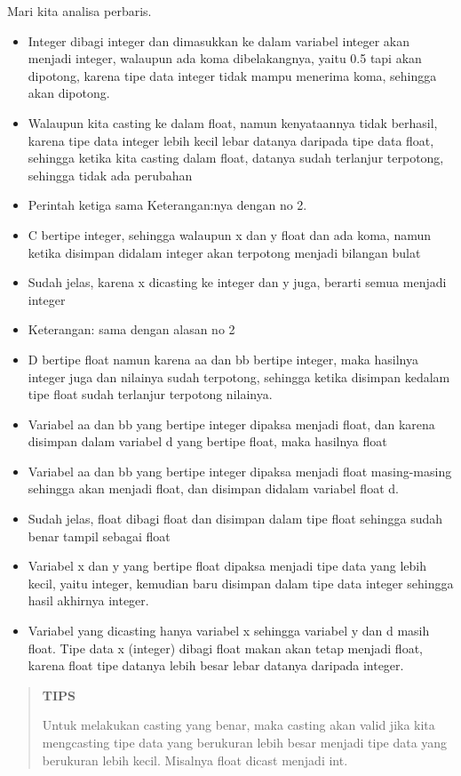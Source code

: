 Mari kita analisa perbaris.

\begin{itemize}

\item
Integer dibagi integer dan dimasukkan ke dalam variabel integer akan
menjadi integer, walaupun ada koma dibelakangnya, yaitu 0.5 tapi akan
dipotong, karena tipe data integer tidak mampu menerima koma, sehingga
akan dipotong.
\item
Walaupun kita casting ke dalam float, namun kenyataannya tidak
berhasil, karena tipe data integer lebih kecil lebar datanya daripada
tipe data float, sehingga ketika kita casting dalam float, datanya
sudah terlanjur terpotong, sehingga tidak ada perubahan
\item
Perintah ketiga sama Keterangan:nya dengan no 2.
\item
C bertipe integer, sehingga walaupun x dan y float dan ada koma, namun
ketika disimpan didalam integer akan terpotong menjadi bilangan bulat
\item
Sudah jelas, karena x dicasting ke integer dan y juga, berarti semua
menjadi integer
\item
Keterangan: sama dengan alasan no 2
\item
D bertipe float namun karena aa dan bb bertipe integer, maka hasilnya
integer juga dan nilainya sudah terpotong, sehingga ketika disimpan
kedalam tipe float sudah terlanjur terpotong nilainya.
\item
Variabel aa dan bb yang bertipe integer dipaksa menjadi float, dan
karena disimpan dalam variabel d yang bertipe float, maka hasilnya
float
\item
Variabel aa dan bb yang bertipe integer dipaksa menjadi float
masing-masing sehingga akan menjadi float, dan disimpan didalam
variabel float d.
\item
Sudah jelas, float dibagi float dan disimpan dalam tipe float sehingga
sudah benar tampil sebagai float
\item
Variabel x dan y yang bertipe float dipaksa menjadi tipe data yang
lebih kecil, yaitu integer, kemudian baru disimpan dalam tipe data
integer sehingga hasil akhirnya integer.
\item
Variabel yang dicasting hanya variabel x sehingga variabel y dan d
masih float. Tipe data x (integer) dibagi float makan akan tetap
menjadi float, karena float tipe datanya lebih besar lebar datanya
daripada integer.
\end{itemize}

\begin{quotation}

{\LARGE {}} \textbf{TIPS} 

Untuk melakukan casting yang benar, maka casting akan valid jika kita mengcasting tipe data yang berukuran lebih besar menjadi tipe data yang berukuran lebih kecil. Misalnya float dicast menjadi int.
\end{quotation}


